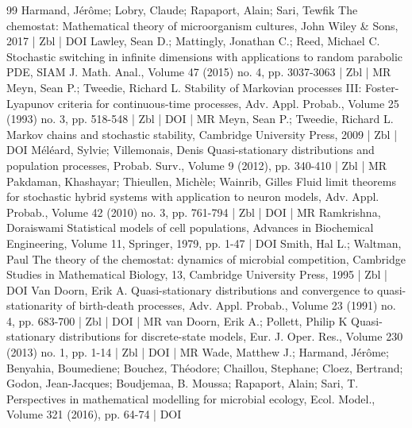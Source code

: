 \begin{thebibliography}{99}
 Harmand, Jérôme; Lobry, Claude; Rapaport, Alain; Sari, Tewfik The chemostat: Mathematical theory of microorganism cultures, John Wiley \& Sons, 2017 | Zbl | DOI
 Lawley, Sean D.; Mattingly, Jonathan C.; Reed, Michael C. Stochastic switching in infinite dimensions with applications to random parabolic PDE, SIAM J. Math. Anal., Volume 47 (2015) no. 4, pp. 3037-3063 | Zbl | MR
 Meyn, Sean P.; Tweedie, Richard L. Stability of Markovian processes III: Foster-Lyapunov criteria for continuous-time processes, Adv. Appl. Probab., Volume 25 (1993) no. 3, pp. 518-548 | Zbl | DOI | MR
 Meyn, Sean P.; Tweedie, Richard L. Markov chains and stochastic stability, Cambridge University Press, 2009 | Zbl | DOI
 Méléard, Sylvie; Villemonais, Denis Quasi-stationary distributions and population processes, Probab. Surv., Volume 9 (2012), pp. 340-410 | Zbl | MR
 Pakdaman, Khashayar; Thieullen, Michèle; Wainrib, Gilles Fluid limit theorems for stochastic hybrid systems with application to neuron models, Adv. Appl. Probab., Volume 42 (2010) no. 3, pp. 761-794 | Zbl | DOI | MR
 Ramkrishna, Doraiswami Statistical models of cell populations, Advances in Biochemical Engineering, Volume 11, Springer, 1979, pp. 1-47 | DOI
 Smith, Hal L.; Waltman, Paul The theory of the chemostat: dynamics of microbial competition, Cambridge Studies in Mathematical Biology, 13, Cambridge University Press, 1995 | Zbl | DOI
 Van Doorn, Erik A. Quasi-stationary distributions and convergence to quasi-stationarity of birth-death processes, Adv. Appl. Probab., Volume 23 (1991) no. 4, pp. 683-700 | Zbl | DOI | MR
 van Doorn, Erik A.; Pollett, Philip K Quasi-stationary distributions for discrete-state models, Eur. J. Oper. Res., Volume 230 (2013) no. 1, pp. 1-14 | Zbl | DOI | MR
 Wade, Matthew J.; Harmand, Jérôme; Benyahia, Boumediene; Bouchez, Théodore; Chaillou, Stephane; Cloez, Bertrand; Godon, Jean-Jacques; Boudjemaa, B. Moussa; Rapaport, Alain; Sari, T. Perspectives in mathematical modelling for microbial ecology, Ecol. Model., Volume 321 (2016), pp. 64-74 | DOI
\end{thebibliography}
